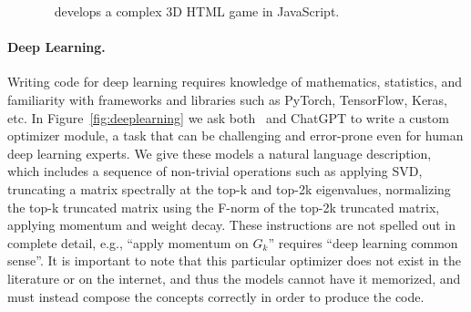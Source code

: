 \begin{figure}[H]
\begin{AIbox}{\DV}
\begin{subfigure}
\caption*{\scriptsize {\bf Episode 2:} the player (\textcolor{blue}{blue}) wanders around. The enemy (\textcolor{red}{red}) attempts to close the gap but crashes into a cube and bounces into the air. Trying to obstruct, the defender (\textcolor{magenta}{magenta}) mimics its move to follow up into the air, but ends up failing. The enemy (\textcolor{red}{red}) catches the player (\textcolor{blue}{blue}) in the end.}
\end{subfigure}
\end{AIbox}
\caption{\DV~ develops a complex 3D HTML game in JavaScript.}
\label{fig:games}
\end{figure}


\paragraph{Deep Learning.}
Writing code for deep learning requires knowledge of mathematics, statistics, and familiarity with frameworks and libraries such as PyTorch, TensorFlow, Keras, etc. 
In Figure~\ref{fig:deeplearning} we ask both \DV\ and ChatGPT to write a custom optimizer module, a task that can be challenging and error-prone even for human deep learning experts. We give these models a natural language description, which includes a sequence of non-trivial operations such as applying SVD, truncating a matrix spectrally at the top-k and top-2k eigenvalues, normalizing the top-k truncated matrix using the F-norm of the top-2k truncated matrix, applying momentum and weight decay.
These instructions are not spelled out in complete detail, e.g., ``apply momentum on $G_k$'' requires ``deep learning common sense''.
It is important to note that this particular optimizer does not exist in the literature or on the internet, and thus the models cannot have it memorized, and must instead compose the concepts correctly in order to produce the code. 



